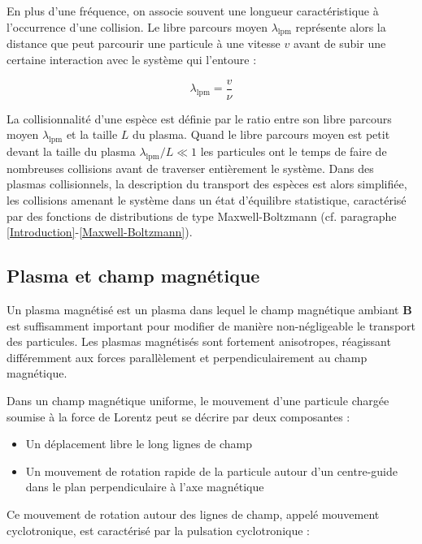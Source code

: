 \begin{refsection}
En plus d'une fréquence, on associe souvent une longueur caractéristique
à l'occurrence d'une collision. Le libre parcours moyen $\lambda_\text{lpm}$
représente alors la distance que peut parcourir une particule à une vitesse
$v$ avant de subir une certaine interaction avec le système qui l'entoure :

\begin{equation}
	\lambda_\text{lpm}=\frac{v}{\nu}
\end{equation} 

La collisionnalité d'une espèce est
définie par le ratio entre son libre parcours moyen $\lambda_\text{lpm}$ et la
taille $L$ du plasma. Quand le libre parcours moyen est petit devant la
taille du plasma $\lambda_\text{lpm}/L\ll 1$
les particules ont le temps de faire de nombreuses collisions avant de
traverser entièrement le système. Dans des plasmas collisionnels, la description
du transport des espèces est alors simplifiée, les collisions amenant le système dans un état
d'équilibre statistique, caractérisé par des fonctions de distributions de
type Maxwell-Boltzmann (cf. paragraphe \ref{Introduction}-\ref{Maxwell-Boltzmann}).

\parencite{Phelps}

\subsection{Plasma et champ magnétique} 
Un plasma magnétisé est un plasma dans lequel le champ magnétique ambiant
$\mathbf{B}$ est suffisamment important pour modifier de manière non-négligeable
le transport des particules. Les plasmas magnétisés sont fortement
anisotropes, réagissant différemment aux forces parallèlement et
perpendiculairement au champ magnétique.

Dans un champ magnétique uniforme, le mouvement d'une particule chargée
soumise à la force de Lorentz peut se décrire par deux composantes :

\begin{itemize}
  \item Un déplacement libre le long lignes de champ
  \item Un mouvement de rotation rapide de la particule
  autour d'un centre-guide dans le plan perpendiculaire à l'axe magnétique
\end{itemize}

Ce mouvement de rotation autour des lignes de champ, appelé mouvement
cyclotronique, est caractérisé par la pulsation cyclotronique : 


\end{refsection}
